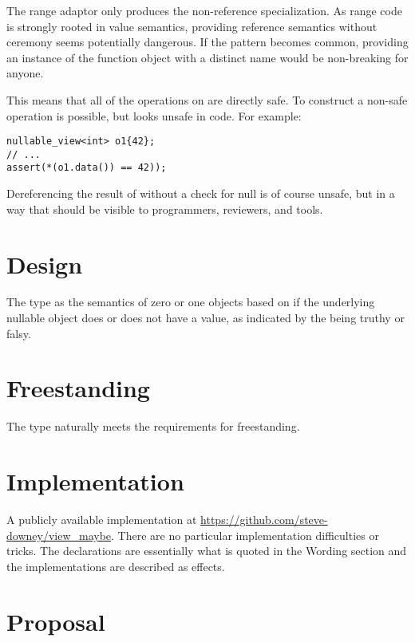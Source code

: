 \documentclass[a4paper,10pt,oneside,openany,final,article]{memoir}
\begin{document}
The range adaptor  only produces the non-reference specialization. As range code is strongly rooted in value semantics, providing reference semantics without ceremony seems potentially dangerous. If the pattern becomes common, providing an instance of the function object with a distinct name would be non-breaking for anyone.

This means that all of the operations on  are directly safe. To construct a non-safe operation is possible, but looks unsafe in code. For example:

\begin{minipage}[t]{\columnwidth}
  \begin{verbatim}
nullable_view<int> o1{42};
// ...
assert(*(o1.data()) == 42));
  \end{verbatim}
\end{minipage}

Dereferencing the result of  without a check for null is of course unsafe, but in a way that should be visible to programmers, reviewers,  and tools.

\chapter{Design}

The type  as the semantics of zero or one objects based on if the underlying nullable object does or does not have a value, as indicated by the  being truthy or falsy.

\chapter{Freestanding}


The type  naturally meets the requirements for freestanding.

\chapter{Implementation}


A publicly available implementation at \url{https://github.com/steve-downey/view_maybe}. There are no particular implementation difficulties or tricks. The declarations are essentially what is quoted in the Wording section and the implementations are described as effects.


\chapter{Proposal}
\end{document}
